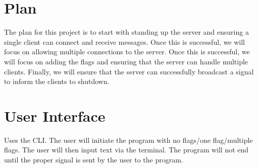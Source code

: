 \documentclass{article}
\begin{document}
  \section*{Plan}
  The plan for this project is to start with standing up the server and ensuring a single client
  can connect and receive messages. Once this is successful, we will focus on allowing multiple
  connections to the server. Once this is successful, we will focus on adding the flags and
    ensuring that the server can handle multiple clients. Finally, we will ensure that the server
    can successfully broadcast a signal to inform the clients to shutdown.
  \section*{User Interface}
Uses the CLI. The user will initiate the program with no flags/one flag/multiple flags. The user
will then input text via the terminal. The program will not end until the proper signal is sent
by the user to the program.
\\
\\
\end{document}
